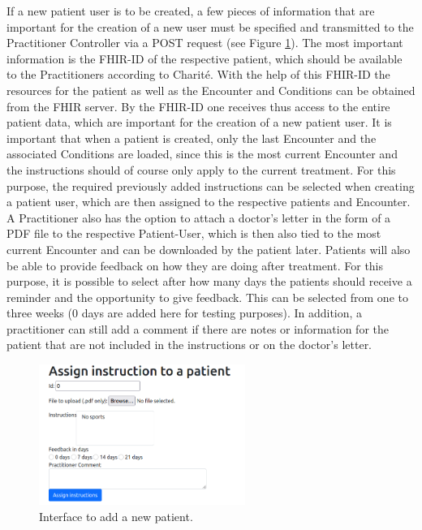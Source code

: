 \documentclass[]{report}
\begin{document}
If a new patient user is to be created, a few pieces of information that are important for the creation of a new user must be specified and transmitted to the Practitioner Controller via a POST request (see Figure \ref{fig:add_patient}). The most important information is the FHIR-ID of the respective patient, which should be available to the Practitioners according to Charité. With the help of this FHIR-ID the resources for the patient as well as the Encounter and Conditions can be obtained from the FHIR server. By the FHIR-ID one receives thus access to the entire patient data, which are important for the creation of a new patient user. It is important that when a patient is created, only the last Encounter and the associated Conditions are loaded, since this is the most current Encounter and the instructions should of course only apply to the current treatment. For this purpose, the required previously added instructions can be selected when creating a patient user, which are then assigned to the respective patients and Encounter. A Practitioner also has the option to attach a doctor's letter in the form of a PDF file to the respective Patient-User, which is then also tied to the most current Encounter and can be downloaded by the patient later. Patients will also be able to provide feedback on how they are doing after treatment. For this purpose, it is possible to select after how many days the patients should receive a reminder and the opportunity to give feedback. This can be selected from one to three weeks (0 days are added here for testing purposes). In addition, a practitioner can still add a comment if there are notes or information for the patient that are not included in the instructions or on the doctor's letter.\\
\begin{figure}[h]
    \centering
    \includegraphics[width=0.6\textwidth]{Add_Patient.png}
    \caption{Interface to add a new patient.}
    \label{fig:add_patient}
\end{figure}
\end{document}
